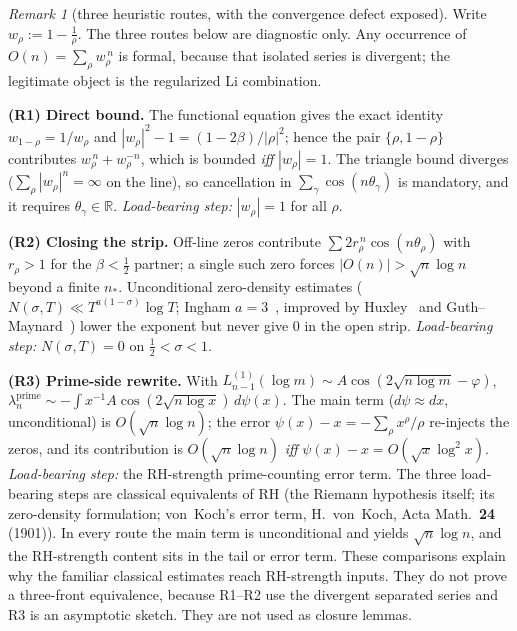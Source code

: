 \documentclass[11pt]{amsart}
\theoremstyle{definition}
\theoremstyle{remark}
\newtheorem{remark}[theorem]{Remark}
\theoremstyle{definition}
\newcommand{\R}{\mathbb{R}}
\begin{document}
\begin{remark}[three heuristic routes, with the convergence defect exposed]\label{prop:three-routes}
Write $w_\rho:=1-\tfrac1\rho$.  The three routes below are diagnostic only.  Any occurrence of
$O(n)=\sum_\rho w_\rho^{\,n}$ is formal, because that isolated series is divergent; the legitimate
object is the regularized Li combination.

\smallskip\noindent\textbf{(R1) Direct bound.} The functional equation gives the exact identity
$w_{1-\rho}=1/w_\rho$ and $|w_\rho|^2-1=(1-2\beta)/|\rho|^2$; hence the pair $\{\rho,1-\rho\}$ contributes
$w_\rho^{\,n}+w_\rho^{-n}$, which is bounded \emph{iff} $|w_\rho|=1$.  The triangle bound diverges
($\sum_\rho|w_\rho|^n=\infty$ on the line), so cancellation in $\sum_\gamma\cos(n\theta_\gamma)$ is
mandatory, and it requires $\theta_\gamma\in\R$.  \emph{Load-bearing step:} $|w_\rho|=1$ for all $\rho$.

\smallskip\noindent\textbf{(R2) Closing the strip.} Off-line zeros contribute $\sum 2r_\rho^{\,n}\cos(n\theta_\rho)$
with $r_\rho>1$ for the $\beta<\tfrac12$ partner; a single such zero forces $|O(n)|>\sqrt n\log n$ beyond
a finite $n_*$.  Unconditional zero-density estimates ($N(\sigma,T)\ll T^{a(1-\sigma)}\log T$; Ingham
$a=3$~\cite{Ingham}, improved by Huxley~\cite{Huxley} and Guth--Maynard~\cite{GuthMaynard}) lower the exponent but never give
$0$ in the open strip.  \emph{Load-bearing step:} $N(\sigma,T)=0$ on $\tfrac12<\sigma<1$.

\smallskip\noindent\textbf{(R3) Prime-side rewrite.} With $L_{n-1}^{(1)}(\log m)\sim A\cos(2\sqrt{n\log m}-\varphi)$,
$\lambda_n^{\mathrm{prime}}\sim-\int x^{-1}A\cos(2\sqrt{n\log x})\,d\psi(x)$.  The main term ($d\psi\approx
dx$, unconditional) is $O(\sqrt n\log n)$; the error $\psi(x)-x=-\sum_\rho x^\rho/\rho$ re-injects the
zeros, and its contribution is $O(\sqrt n\log n)$ \emph{iff} $\psi(x)-x=O(\sqrt x\log^2 x)$.
\emph{Load-bearing step:} the RH-strength prime-counting error term.
\smallskip
The three load-bearing steps are classical equivalents of RH (the Riemann hypothesis itself; its
zero-density formulation; von~Koch's error term, H.~von~Koch, Acta Math.\ \textbf{24} (1901)).  In
every route the main term is unconditional and yields $\sqrt n\log n$, and the RH-strength content sits
in the tail or error term.  These comparisons explain why the familiar classical estimates reach RH-strength inputs.  They do not
prove a three-front equivalence, because R1--R2 use the divergent separated series and R3 is an
asymptotic sketch.  They are not used as closure lemmas.
\end{remark}
\end{document}
